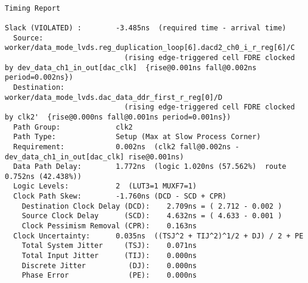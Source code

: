 \documentclass{article}
\begin{document}
\begin{lstlisting}

Timing Report

Slack (VIOLATED) :        -3.485ns  (required time - arrival time)
  Source:                 worker/data_mode_lvds.reg_duplication_loop[6].dacd2_ch0_i_r_reg[6]/C
                            (rising edge-triggered cell FDRE clocked by dev_data_ch1_in_out[dac_clk]  {rise@0.001ns fall@0.002ns period=0.002ns})
  Destination:            worker/data_mode_lvds.dac_data_ddr_first_r_reg[0]/D
                            (rising edge-triggered cell FDRE clocked by clk2'  {rise@0.000ns fall@0.001ns period=0.001ns})
  Path Group:             clk2
  Path Type:              Setup (Max at Slow Process Corner)
  Requirement:            0.002ns  (clk2 fall@0.002ns - dev_data_ch1_in_out[dac_clk] rise@0.001ns)
  Data Path Delay:        1.772ns  (logic 1.020ns (57.562%)  route 0.752ns (42.438%))
  Logic Levels:           2  (LUT3=1 MUXF7=1)
  Clock Path Skew:        -1.760ns (DCD - SCD + CPR)
    Destination Clock Delay (DCD):    2.709ns = ( 2.712 - 0.002 ) 
    Source Clock Delay      (SCD):    4.632ns = ( 4.633 - 0.001 ) 
    Clock Pessimism Removal (CPR):    0.163ns
  Clock Uncertainty:      0.035ns  ((TSJ^2 + TIJ^2)^1/2 + DJ) / 2 + PE
    Total System Jitter     (TSJ):    0.071ns
    Total Input Jitter      (TIJ):    0.000ns
    Discrete Jitter          (DJ):    0.000ns
    Phase Error              (PE):    0.000ns


\end{lstlisting}
\end{document}
